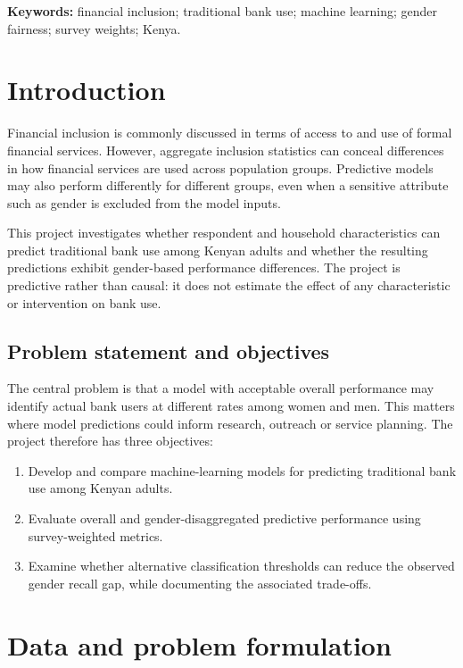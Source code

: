 \documentclass[11pt,a4paper]{article}
\begin{document}
\textcolor{StrathBlue}{\textbf{Keywords:}} financial inclusion; traditional bank use; machine learning; gender fairness; survey weights; Kenya.

\section{Introduction}

Financial inclusion is commonly discussed in terms of access to and use of formal financial services. However, aggregate inclusion statistics can conceal differences in how financial services are used across population groups. Predictive models may also perform differently for different groups, even when a sensitive attribute such as gender is excluded from the model inputs.

This project investigates whether respondent and household characteristics can predict traditional bank use among Kenyan adults and whether the resulting predictions exhibit gender-based performance differences. The project is predictive rather than causal: it does not estimate the effect of any characteristic or intervention on bank use.

\subsection{Problem statement and objectives}

The central problem is that a model with acceptable overall performance may identify actual bank users at different rates among women and men. This matters where model predictions could inform research, outreach or service planning. The project therefore has three objectives:
\begin{enumerate}[leftmargin=*]
  \item Develop and compare machine-learning models for predicting traditional bank use among Kenyan adults.
  \item Evaluate overall and gender-disaggregated predictive performance using survey-weighted metrics.
  \item Examine whether alternative classification thresholds can reduce the observed gender recall gap, while documenting the associated trade-offs.
\end{enumerate}

\section{Data and problem formulation}
\end{document}
